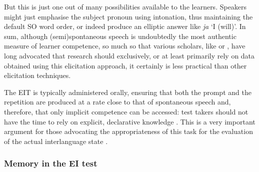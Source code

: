 But this is just one out of many possibilities available to the learners. Speakers might just emphasise the subject pronoun using intonation, thus maintaining the default SO word order, or indeed produce an elliptic answer like \textit{ja} ‘I (will)’. In sum, although (semi)spontaneous speech is undoubtedly the most authentic \citep{Lewkowicz2000} measure of learner competence, so much so that various scholars, like \citet{Krashen1981} or \citet{Pienemann1998}, have long advocated that research should exclusively, or at least primarily rely on data obtained using this elicitation approach, it certainly is less practical than other elicitation techniques.

The EIT is typically administered orally, ensuring that both the prompt and the repetition are produced at a rate close to that of spontaneous speech and, therefore, that only implicit competence can be accessed: test takers should not have the time to rely on explicit, declarative knowledge \citep{Ellis2005}. This is a very important argument for those advocating the appropriateness of this task for the evaluation of the actual interlanguage state \citep{Erlam2006}.

\subsubsection{Memory in the EI test}

